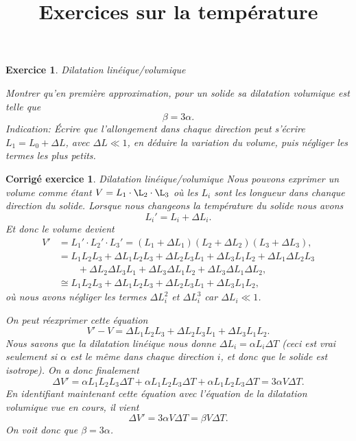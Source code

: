 \documentclass[a4paper,12pt]{article}
\title{Exercices sur la température}
\date{}
\newtheorem{exercice}{Exercice}
\newtheorem{corrige}{Corrig\'e exercice}
\begin{document}
\maketitle

\begin{exercice}{Dilatation linéique/volumique}

Montrer qu’en première approximation, pour un solide sa dilatation volumique est telle que 
\begin{equation}
\beta=3\alpha.
\end{equation}
Indication: Écrire que l'allongement dans chaque direction peut s'écrire $L_1=L_0+\Delta L$, avec $\Delta L\ll 1$,
en déduire la variation
du volume, puis négliger les termes les plus petits.
\end{exercice}

\begin{corrige}{Dilatation linéique/volumique}
Nous pouvons exprimer un volume comme étant $V=L_1\cdot\L_2\cdot\L_3$ où les $L_i$ sont les longueur
dans chanque direction du solide. Lorsque nous changeons la température du solide nous avons 
\begin{equation}
L_i'=L_i+\Delta L_i.
\end{equation}
Et donc le volume devient 
\begin{align}
V'&=L_1'\cdot L_2'\cdot L_3'=(L_1+\Delta L_1)(L_2+\Delta L_2)(L_3+\Delta L_3),\nonumber\\
  &=L_1L_2L_3+\Delta L_1 L_2L_3+\Delta L_2 L_3L_1+\Delta L_3 L_1L_2+\Delta L_1 \Delta L_2L_3\nonumber\\
  &\quad\quad+\Delta L_2 \Delta L_3L_1+\Delta L_3 \Delta L_1L_2+\Delta L_3 \Delta L_1 \Delta L_2,\nonumber\\
  &\cong L_1L_2L_3+\Delta L_1 L_2L_3+\Delta L_2 L_3L_1+\Delta L_3 L_1L_2,
\end{align}
où nous avons négliger les termes $\Delta L_i^2$ et $\Delta L_i^3$ car $\Delta L_i\ll 1$.

On peut réexprimer cette équation 
\begin{equation}
V'-V=\Delta L_1 L_2L_3+\Delta L_2 L_3L_1+\Delta L_3 L_1L_2.
\end{equation}
Nous savons que la dilatation linéique nous donne $\Delta L_i=\alpha L_i\Delta T$ (ceci est vrai seulement si $\alpha$ est le même dans chaque direction $i$, et donc que le solide est isotrope). On a donc finalement
\begin{equation}
\Delta V'=\alpha L_1 L_2L_3\Delta T+\alpha L_1 L_2L_3\Delta T+\alpha L_1 L_2L_3\Delta T=3\alpha V\Delta T.
\end{equation}
En identifiant maintenant cette équation avec l'équation de la dilatation volumique vue en cours, il vient
\begin{equation}
\Delta V'=3\alpha V\Delta T=\beta V\Delta T.
\end{equation}
On voit donc que $\beta=3\alpha$.

\end{corrige}
\end{document}
